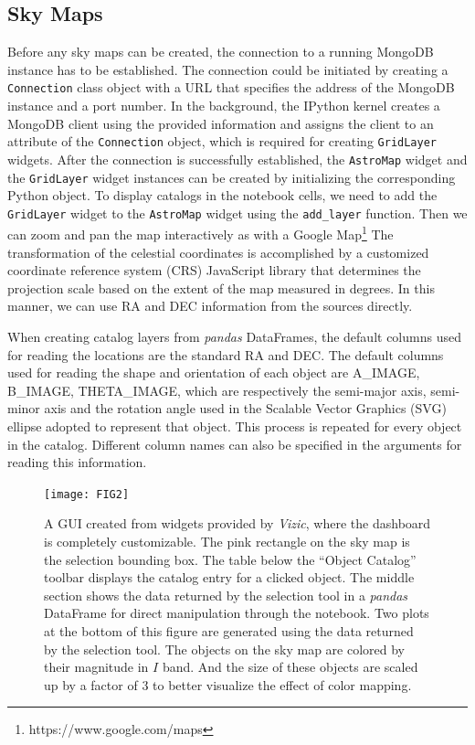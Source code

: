 \documentclass[5p,authoryear]{elsarticle}
\begin{document}
\subsection{Sky Maps}
\label{basic}
Before any sky maps can be created, the connection to a running MongoDB instance has to be established.
The connection could be initiated by creating a \texttt{Connection} class object with a URL that specifies the address of the MongoDB instance and a port number. In the background, the IPython kernel creates a MongoDB client using the provided information and assigns the client to an attribute of the \texttt{Connection} object, which is required for creating \texttt{GridLayer} widgets.
After the connection is successfully established, the \texttt{AstroMap} widget and the \texttt{GridLayer} widget instances can be created by initializing the corresponding Python object. To display catalogs in the notebook cells, we need to add the \texttt{GridLayer} widget to the \texttt{AstroMap} widget using the \texttt{add\_layer} function.
Then we can zoom and pan the map interactively as with a Google Map\footnote{https://www.google.com/maps}
The transformation of the celestial coordinates is accomplished by a customized coordinate reference system (CRS) JavaScript library that determines the projection scale based on the extent of the map measured in degrees. In this manner, we can use RA and DEC information from the sources directly.

When creating catalog layers from \textit{pandas} DataFrames, the default columns used for reading the locations are the standard RA and DEC. The default columns used for reading the shape and orientation of each object are A\_IMAGE, B\_IMAGE, THETA\_IMAGE, which are respectively the semi-major axis, semi-minor axis and the rotation angle used in the Scalable Vector Graphics (SVG) \citep{SVG} ellipse adopted to represent that object. This process is repeated for every object in the catalog.
Different column names can also be specified in the arguments for reading this information.
\begin{figure}[h!]
	\centering
	\texttt{[image: FIG2]}
	\caption{A GUI created from widgets provided by \textit{Vizic}, where the dashboard is completely customizable. The pink rectangle on the sky map is the selection bounding box. The table below the ``Object Catalog'' toolbar displays the catalog entry for a clicked object. The middle section shows the data returned by the selection tool in a \textit{pandas} DataFrame for direct manipulation through the notebook.
	Two plots at the bottom of this figure are generated using the data returned by the selection tool.
    The objects on the sky map are colored by their magnitude in $I$ band. And the size of these objects are scaled up by a factor of 3 to better visualize the effect of color mapping. }
	\label{fig:overall}
\end{figure}
\end{document}

